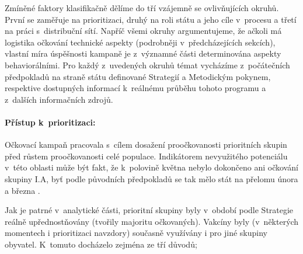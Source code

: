 Zmíněné faktory klasifikačně dělíme do tří vzájemně se ovlivňujících okruhů. První se zaměřuje na prioritizaci, druhý na roli státu a jeho cíle v~procesu a třetí na práci s~distribuční sítí. %
%
Napříč všemi okruhy argumentujeme, že ačkoli má logistika očkování technické aspekty (podrobněji v~předcházejících sekcích), vlastní míra úspěšnosti kampaně je z~významné části determinována aspekty behaviorálními. Pro každý z~uvedených okruhů témat vycházíme z~počátečních předpokladů na straně státu definované Strategií a Metodickým pokynem, respektive dostupných informací k~reálnému průběhu tohoto programu a z~dalších informačních zdrojů.


\paragraph{Přístup k~prioritizaci:} Očkovací kampaň pracovala s~cílem dosažení proočkovanosti prioritních skupin před růstem proočkovanosti celé populace. Indikátorem nevyužitého potenciálu v~této oblasti může být fakt, že k~polovině května nebylo dokončeno ani očkování skupiny I.A, byť podle původních předpokladů se tak mělo stát na přelomu února a března \cite{ockovani_mp}.



Jak je patrné v~analytické části, prioritní skupiny byly v~období podle Strategie reálně upřednostňovány (tvořily majoritu očkovaných). Vakcíny byly (v~některých momentech i prioritizaci navzdory) současně využívány i pro jiné skupiny obyvatel. K~tomuto docházelo zejména ze tří důvodů;
%

